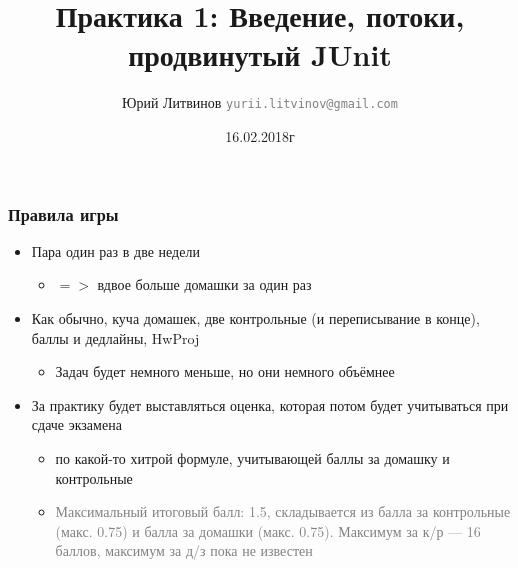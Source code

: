 \documentclass[xetex,mathserif,serif]{beamer}
\title{Практика 1: Введение, потоки, продвинутый JUnit}
\author[Юрий Литвинов]{Юрий Литвинов \newline \textcolor{gray}{\small\texttt{yurii.litvinov@gmail.com}}}
\date{16.02.2018г}
\begin{document}
	
	\frame{\titlepage}

	\begin{frame}
		\frametitle{Правила игры}
		\begin{itemize}
			\item Пара один раз в две недели
			\begin{itemize}
				\item $=>$ вдвое больше домашки за один раз
			\end{itemize}
			\item Как обычно, куча домашек, две контрольные (и переписывание в конце), баллы и дедлайны, HwProj
			\begin{itemize}
				\item Задач будет немного меньше, но они немного объёмнее
			\end{itemize}
			\item За практику будет выставляться оценка, которая потом будет учитываться при сдаче экзамена
			\begin{itemize}
				\item по какой-то хитрой формуле, учитывающей баллы за домашку и контрольные
				\item \textcolor{gray}{Максимальный итоговый балл: 1.5, складывается из балла за контрольные (макс. 0.75) и балла за домашки (макс. 0.75). Максимум за к/р --- 16 баллов, максимум за д/з пока не известен}
			\end{itemize}
		\end{itemize}
	\end{frame}
\end{document}
